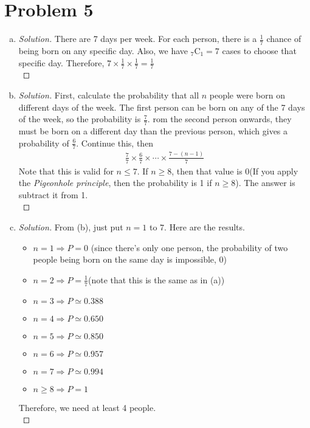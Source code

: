 \section*{Problem 5}
	\begin{enumerate} [(a)]
		\item \begin{proof} [Solution]
			There are 7 days per week. For each person, there is a $\frac{1}{7}$ chance of being born on any specific day. Also, we have $_{7}\mathrm{C}_{1} = 7$ cases to choose that specific day. Therefore, $7\times\frac{1}{7}\times\frac{1}{7} = \frac{1}{7}$\\
		\end{proof}
		\item \begin{proof} [Solution]
			First, calculate the probability that all $n$ people were born on different days of the week. The first person can be born on any of the 7 days of the week, so the probability is $\frac{7}{7}$. rom the second person onwards, they must be born on a different day than the previous person, which gives a probability of $\frac{6}{7}$. Continue this, then
			\begin{align*}
				\frac{7}{7}\times\frac{6}{7}\times\cdots\times\frac{7 - (n - 1)}{7}
			\end{align*}
			Note that this is valid for $n \leq 7$. If $n \geq 8$, then that value is 0(If you apply the \textit{Pigeonhole principle}, then the probability is 1 if $n \geq 8$). The answer is subtract it from 1.\\
		\end{proof}
		\item \begin{proof} [Solution]
			From (b), just put $n = 1$ to $7$. Here are the results.
			\begin{itemize}
				\item $n = 1\Rightarrow P = 0$ (since there's only one person, the probability of two people being born on the same day is impossible, 0)
				\item $n = 2\Rightarrow P = \frac{1}{7}$(note that this is the same as in (a))
				\item $n = 3\Rightarrow P \simeq 0.388$
				\item $n = 4\Rightarrow P\simeq 0.650$
				\item $n = 5\Rightarrow P\simeq 0.850$
				\item $n = 6\Rightarrow P\simeq 0.957$
				\item $n = 7\Rightarrow P\simeq 0.994$
				\item $n \geq 8\Rightarrow P = 1$
			\end{itemize}
			Therefore, we need at least 4 people.\\
		\end{proof}
	\end{enumerate}